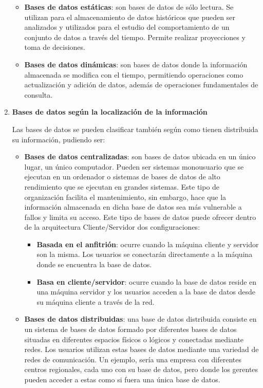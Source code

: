 \begin{enumerate}[label=(\alph*)]
    \begin{itemize}
        \item \textbf{Bases de datos estáticas}: son bases de datos de sólo lectura. Se utilizan para el almacenamiento de datos históricos que pueden ser analizados y utilizados para el estudio del comportamiento de un conjunto de datos a través del tiempo. Permite realizar proyecciones y toma de decisiones.

        \item \textbf{Bases de datos dinámicas}: son bases de datos donde la información almacenada se modifica con el tiempo, permitiendo operaciones como actualización y adición de datos, además de operaciones fundamentales de consulta.
    \end{itemize}

    \item \textbf{Bases de datos según la localización de la información}

    Las bases de datos se pueden clasificar también según como tienen distribuida su información, pudiendo ser:

    \begin{itemize}
    \item \textbf{Bases de datos centralizadas}: son bases de datos ubicada en un único lugar, un único computador. Pueden ser sistemas monousuario que se ejecutan en un ordenador o sistemas de bases de datos de alto rendimiento que se ejecutan en grandes sistemas. Este tipo de organización facilita el mantenimiento, sin embargo, hace que la información almacenada en dicha base de datos sea más vulnerable a fallos y limita su acceso. Este tipo de bases de datos puede ofrecer dentro de la arquitectura Cliente/Servidor dos configuraciones:

    \begin{itemize}
        \item \textbf{Basada en el anfitrión}: ocurre cuando la máquina cliente y servidor son la misma. Los usuarios se conectarán directamente a la máquina donde se encuentra la base de datos.

        \item \textbf{Basa en cliente/servidor}: ocurre cuando la base de datos reside en una máquina servidor y los usuarios acceden a la base de datos desde su máquina cliente a través de la red.
    \end{itemize}

    \item \textbf{Bases de datos distribuidas}: una base de datos distribuida consiste en un sistema de bases de datos formado por diferentes bases de datos situadas en diferentes espacios físicos o lógicos y conectadas mediante redes. Los usuarios utilizan estas bases de datos mediante una variedad de redes de comunicación. Un ejemplo, sería una empresa con diferentes centros regionales, cada uno con su base de datos, pero donde los gerentes pueden acceder a estas como si fuera una única base de datos.
    \end{itemize}


\end{enumerate}
